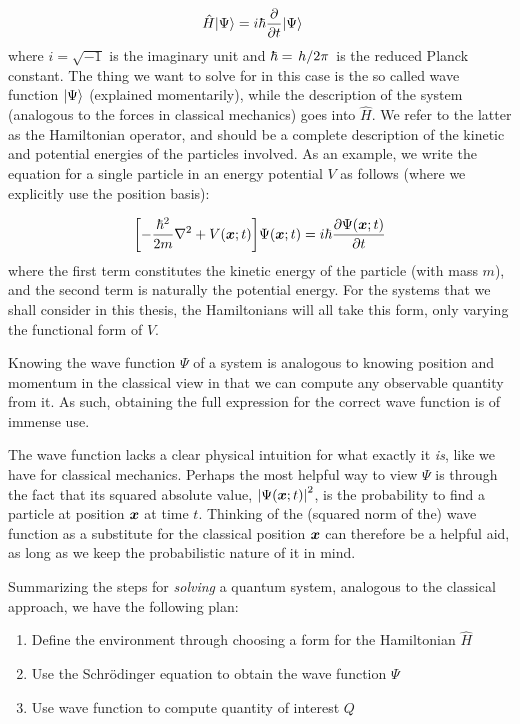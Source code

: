 \documentclass[Thesis.tex]{subfiles}
\begin{document}
\begin{align}
    \hat H| \Psi \rangle &= i\hbar \pdv{}{t}| \Psi \rangle\label{eq:schrodinger-time-dependent-general}
\end{align}
%
where $i=\sqrt{-1}$ is the imaginary unit and $\hbar=\flatfrac{h}{2\pi}$ is the reduced Planck constant.
The thing we want to solve for in this case is the so called wave function $| \Psi \rangle$
(explained momentarily), while the description of the system (analogous to the forces in
classical mechanics) goes into $\hat H$. We refer to the latter as the Hamiltonian
operator, and should be a complete description of the kinetic and potential energies of
the particles involved. As an example, we write the equation for a single particle in an energy
potential $V$ as follows (where we explicitly use the position basis):

\begin{align}
    \qty[-\frac{\hbar^2}{2m} \laplacian + V(\vb x; t)]\Psi(\vb x;t) =
    i\hbar\pdv{\Psi(\vb x; t)}{t}\label{eq:schrodinger-time-dependent-position-basis}
\end{align}
%
where the first term constitutes the kinetic energy of the particle (with mass $m$), and the second term is
naturally the potential energy. For the systems that we shall consider in this thesis, the
Hamiltonians will all take this form, only varying the functional form of $V$.

Knowing the wave function $\Psi$ of a system is analogous to knowing position and momentum
in the classical view in that we can compute any observable quantity from it. As such,
obtaining the full expression for the correct wave function is of immense use.

The wave function lacks a clear physical intuition for what exactly it \emph{is},
like we have for classical mechanics. Perhaps the most helpful way to view $\Psi$ is
through the fact that its squared absolute value, $\abs{\Psi(\bm{x}; t)}^2$, is the
probability to find a particle at position $\bm{x}$ at time $t$. Thinking of the (squared
norm of the) wave function as a substitute for the classical position $\bm{x}$ can
therefore be a helpful aid, as long as we keep the probabilistic nature of it in mind.

Summarizing the steps for \emph{solving} a quantum system, analogous to the
classical approach, we have the following plan:
\begin{enumerate}
    \item Define the environment through choosing a form for the Hamiltonian $\hat H$
    \item Use the Schrödinger equation to obtain the wave function $\Psi$
    \item Use wave function to compute quantity of interest $Q$
\end{enumerate}
\end{document}
